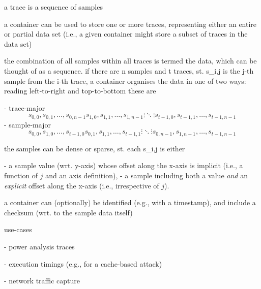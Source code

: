 
a trace is a sequence of samples

a container can be used to store one or more traces, representing either an
entire or partial data set (i.e., a given container might store a subset of 
traces in the data set)

the combination of all samples within all traces is termed the data, which
can be thought of as a sequence.  if there are n samples and t traces, st. 
s_{i,j} is the j-th sample from the i-th trace, a container organises the 
data in one of two ways: reading left-to-right and top-to-bottom these are

- trace-major 
  \[
  s_{  0,  0}, s_{  0,  1}, \ldots, s_{  0,n-1}
  s_{  1,  0}, s_{  1,  1}, \ldots, s_{  1,n-1}
  \vdots                    \ddots  \vdots
  s_{t-1,  0}, s_{t-1,  1}, \ldots, s_{t-1,n-1}
  \]
- sample-major
  \[
  s_{  0,  0}, s_{  1,  0}, \ldots, s_{t-1,  0}
  s_{  0,  1}, s_{  1,  1}, \ldots, s_{t-1,  1}
  \vdots                    \ddots  \vdots
  s_{  0,n-1}, s_{  1,n-1}, \ldots, s_{t-1,n-1}
  \]

the samples can be dense or sparse, st. each s_{i,j} is either

- a sample value (wrt. y-axis) whose offset along the x-axis is implicit 
  (i.e., a function of $j$ and an axis definition),
- a sample including both a value {\em and} an {\em explicit} offset along 
  the x-axis (i.e., irrespective of $j$).

a container can (optionally) be identified (e.g., with a timestamp), and
include a checksum (wrt. to the sample data itself) 


use-cases

- power analysis traces

- execution timings (e.g., for a cache-based attack)

- network traffic capture

